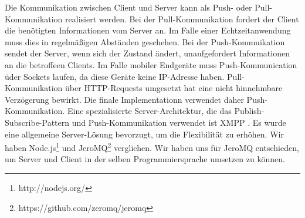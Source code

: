 Die Kommunikation zwischen Client und Server kann als Push- oder Pull-Kommunikation realisiert werden. 
Bei der Pull-Kommunikation fordert der Client die benötigten Informationen vom Server an. Im Falle einer Echtzeitanwendung muss dies in regelmäßigen Abständen geschehen.
Bei der Push-Kommuikation sendet der Server, wenn sich der Zustand ändert, unaufgefordert Informationen an die betroffeen Clients.
Im Falle mobiler Endgeräte muss Push-Kommunication üder Sockets laufen, da diese Geräte keine IP-Adresse haben.
Pull-Kommunikation über HTTP-Requests umgesetzt hat eine nicht hinnehmbare Verzögerung bewirkt.
Die finale Implementationn verwendet daher Push-Kommunikation. Eine spezialisierte Server-Architektur, die das Publish-Subscribe-Pattern und Push-Kommunikation verwendet ist XMPP \cite{XMPP}. Es wurde eine allgemeine Server-Lösung bevorzugt, um die Flexibilität zu erhöhen. Wir haben Node.js\footnote{http://nodejs.org/} und JeroMQ\footnote{https://github.com/zeromq/jeromq} verglichen. Wir haben uns für JeroMQ entschieden, um Server und Client in der selben Programmiersprache umsetzen zu können.